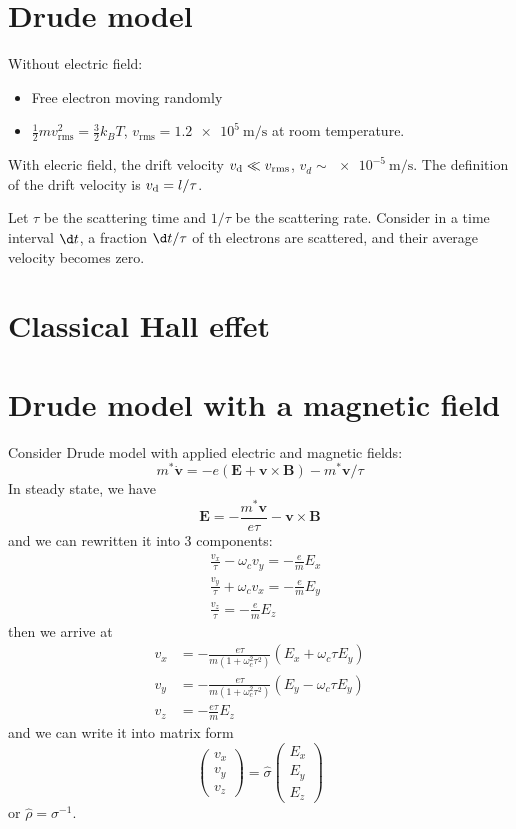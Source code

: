 \section{Drude model}

Without electric field:
\begin{itemize}
  \item Free electron moving randomly
  \item $\frac12 mv_\text{rms}^2 = \frac32 k_BT$, $v_\text{rms} = \qty{1.2e5}{\m/\s}$ at room temperature.
\end{itemize}

With elecric field, the drift velocity $v_\text d \ll v_\text{rms}$, $v_d \sim \qty{e-5}{\m/\s}$.
The definition of the drift velocity is $v_\text d = l/\tau$.

Let $\tau$ be the scattering time and $1/\tau$ be the scattering rate.
Consider in a time interval $\d t$, a fraction $\d t/\tau$ of th electrons are scattered, and their average velocity becomes zero.

\section{Classical Hall effet}

\section{Drude model with a magnetic field}

Consider Drude model with applied electric and magnetic fields:
\[
  m^* \dot{\bm v} = -e(\bm E + \bm v \times \bm B) - m^*\bm v/\tau
\]
In steady state, we have
\[
  \bm E = -\frac{m^*\bm v}{e\tau} - \bm v \times \bm B
\]
and we can rewritten it into 3 components:
\[
  \begin{aligned}
    & \frac{v_x}\tau - \omega_cv_y = -\frac em E_x\\
    & \frac{v_y}\tau + \omega_cv_x = -\frac em E_y\\
    & \frac{v_z}\tau = -\frac em E_z
  \end{aligned}
\]
then we arrive at
\[
  \begin{aligned}
    v_x & = -\frac{e\tau}{m(1 + \omega_c^2\tau^2)}(E_x + \omega_c\tau E_y)\\
    v_y & = -\frac{e\tau}{m(1 + \omega_c^2\tau^2)}(E_y - \omega_c\tau E_y)\\
    v_z & = -\frac{e\tau}m E_z
  \end{aligned}
\]
and we can write it into matrix form
\[
  \begin{pmatrix}
    v_x\\v_y\\v_z
  \end{pmatrix} =
  \hat\sigma
  \begin{pmatrix}
    E_x\\E_y\\E_z
  \end{pmatrix}
\]
or $\hat \rho = \sigma^{-1}$.

